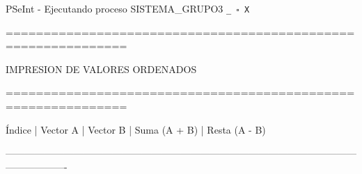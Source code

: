 \documentclass[12pt,a4paper]{article}
\newcommand{\consola}[1]{\noindent\textcolor{pseString}{#1}}
\newenvironment{PSeIntWindow}{%
	\begin{tcolorbox}[
		breakable,
		enhanced,
		colback=white,
		colframe=black!60,
		boxrule=0.5pt,
		arc=1mm,
		left=0mm,
		right=0mm,
		top=0mm,
		bottom=2mm,
		width=\textwidth
		]
	}{%
	\end{tcolorbox}
}
\newcommand{\BarraPSeInt}{%
	\colorbox{gray!20}{%
		\parbox{\dimexpr\textwidth-2\fboxsep\relax}{%
			\small
			\textcolor{pseString}{\faPlayCircle}
			\hspace{0.3em}
			PSeInt - Ejecutando proceso SISTEMA\_GRUPO3
			\hfill
			\texttt{\_ \hspace{0.5em} \(\square\) \hspace{0.5em} X}
		}
	}
}
\begin{document}
	\begin{PSeIntWindow}
		
		\BarraPSeInt
		
		\vspace{0.2cm}
		
		\ttfamily\small
		
		\consola{==============================================================}\par
		
		\begin{center}
			\textcolor{pseString}{IMPRESION DE VALORES ORDENADOS}
		\end{center}
		
		\consola{==============================================================}\par
		
		\vspace{0.25cm}
		
		\consola{Índice \hspace{0.2cm}| \hspace{0.2cm} Vector A \hspace{0.2cm}| \hspace{0.2cm} Vector B \hspace{0.2cm}| \hspace{0.2cm} Suma (A + B) \hspace{0.2cm}| \hspace{0.2cm} Resta (A - B)}\par
		\consola{-------------------------------------------------------------------------------------------------------------------------------}\par
		

\end{PSeIntWindow}
\end{document}
